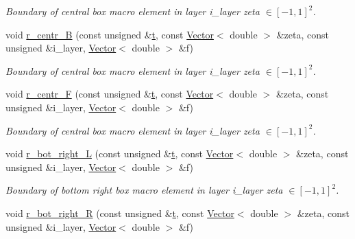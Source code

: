 \begin{DoxyCompactItemize}
\begin{DoxyCompactList}\small\item\em Boundary of central box macro element in layer i\+\_\+layer zeta $ \in [-1,1]^2 $. \end{DoxyCompactList}\item 
void \hyperlink{classoomph_1_1QuarterTubeDomain_a32896043befe8df1ff01d9de166c1201}{r\+\_\+centr\+\_\+B} (const unsigned \&\hyperlink{cfortran_8h_af6f0bd3dc13317f895c91323c25c2b8f}{t}, const \hyperlink{classoomph_1_1Vector}{Vector}$<$ double $>$ \&zeta, const unsigned \&i\+\_\+layer, \hyperlink{classoomph_1_1Vector}{Vector}$<$ double $>$ \&f)
\begin{DoxyCompactList}\small\item\em Boundary of central box macro element in layer i\+\_\+layer zeta $ \in [-1,1]^2 $. \end{DoxyCompactList}\item 
void \hyperlink{classoomph_1_1QuarterTubeDomain_ace2c74d570fcb6a1ddf7a045ab3975c6}{r\+\_\+centr\+\_\+F} (const unsigned \&\hyperlink{cfortran_8h_af6f0bd3dc13317f895c91323c25c2b8f}{t}, const \hyperlink{classoomph_1_1Vector}{Vector}$<$ double $>$ \&zeta, const unsigned \&i\+\_\+layer, \hyperlink{classoomph_1_1Vector}{Vector}$<$ double $>$ \&f)
\begin{DoxyCompactList}\small\item\em Boundary of central box macro element in layer i\+\_\+layer zeta $ \in [-1,1]^2 $. \end{DoxyCompactList}\item 
void \hyperlink{classoomph_1_1QuarterTubeDomain_a1c28597fc3361c177620ed914d1731ac}{r\+\_\+bot\+\_\+right\+\_\+L} (const unsigned \&\hyperlink{cfortran_8h_af6f0bd3dc13317f895c91323c25c2b8f}{t}, const \hyperlink{classoomph_1_1Vector}{Vector}$<$ double $>$ \&zeta, const unsigned \&i\+\_\+layer, \hyperlink{classoomph_1_1Vector}{Vector}$<$ double $>$ \&f)
\begin{DoxyCompactList}\small\item\em Boundary of bottom right box macro element in layer i\+\_\+layer zeta $ \in [-1,1]^2 $. \end{DoxyCompactList}\item 
void \hyperlink{classoomph_1_1QuarterTubeDomain_ac269033d05cfc31f78ef6c555723ba3e}{r\+\_\+bot\+\_\+right\+\_\+R} (const unsigned \&\hyperlink{cfortran_8h_af6f0bd3dc13317f895c91323c25c2b8f}{t}, const \hyperlink{classoomph_1_1Vector}{Vector}$<$ double $>$ \&zeta, const unsigned \&i\+\_\+layer, \hyperlink{classoomph_1_1Vector}{Vector}$<$ double $>$ \&f)

\end{DoxyCompactItemize}
